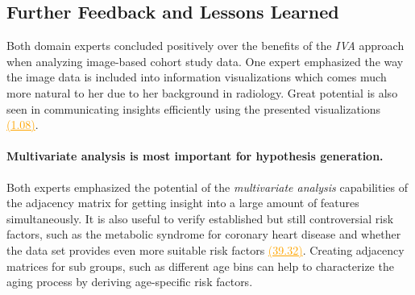 \documentclass[journal]{style/vgtc} 			          %
\newcommand{\com}[1]{\textcolor{orange}{\uline{#1}}}
\begin{document}

\subsection{Further Feedback and Lessons Learned} \label{Lessons Learned}
%
Both domain experts concluded positively over the benefits of the \emph{IVA} approach when analyzing image-based cohort study data.
%
One expert emphasized the way the image data is included into information visualizations which comes much more natural to her due to her background in radiology.
%
%
Great potential is also seen in communicating insights efficiently using the presented visualizations \com{(1.08)}.
%
\paragraph{Multivariate analysis is most important for hypothesis generation.}
Both experts emphasized the potential of the \emph{multivariate analysis} capabilities of the adjacency matrix for getting insight into a large amount of features simultaneously.
%
It is also useful to verify established but still controversial risk factors, such as the metabolic syndrome for coronary heart disease and whether the data set provides even more suitable risk factors \com{(39.32)}.
%
Creating adjacency matrices for sub groups, such as different age bins can help to characterize the aging process by deriving age-specific risk factors.
\end{document}
